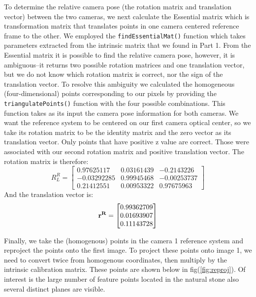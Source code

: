 \documentclass[a4paper]{article}
\begin{document}
To determine the relative camera pose (the rotation matrix and translation vector) between the two cameras, we next calculate the Essential matrix which is transformation matrix that translates points in one camera centered reference frame to the other.  We employed the \verb|findEssentialMat()| function which takes parameters extracted from the intrinsic matrix that we found in Part 1.  From the Essential matrix it is possible to find the relative camera pose, however, it is ambiguous--it returns two possible rotation matrices and one translation vector, but we do not know which rotation matrix is correct, nor the sign of the translation vector.  To resolve this ambiguity we calculated the homogeneous (four-dimensional) points corresponding to our pixels by providing the \verb|triangulatePoints()| function with the four possible combinations.  This function takes as its input the camera pose information for both cameras.  We want the reference system to be centered on our first camera optical center, so we take its rotation matrix to be the identity matrix and the zero vector as its translation vector.  Only points that have positive z value are correct.  Those were associated with our second rotation matrix and positive translation vector.  The rotation matrix is therefore:
\begin{equation*}
	R _L^R= 
	\begin{bmatrix} 
	0.97625117 & 0.03161439 & -0.2143226\\
       -0.03292285 & 0.99945468 &  -0.00253737\\
        0.21412551 & 0.00953322 &  0.97675963
       \end{bmatrix}
\end{equation*} 
And the translation vector is:
\begin{align*}
	\bf{r}^R = 
	\begin{bmatrix} 
		0.99362709\\
               0.01693907\\
               0.11143728
	\end{bmatrix}
\end{align*}

Finally, we take the (homogenous) points in the camera 1 reference system and reproject the points onto the first image.  To project these points onto image 1, we need to convert twice from homogenous coordinates, then multiply by the intrinsic calibration matrix. These points are shown below in fig(\ref{fig:reproj}).  Of interest is the large number of feature points located in the natural stone also several distinct planes are visible.
\end{document}
